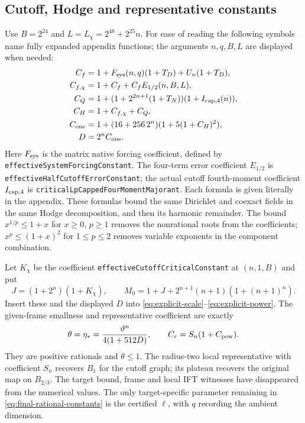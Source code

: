 \documentclass[11pt,a4paper]{article}
\numberwithin{equation}{section}
\theoremstyle{definition}
\theoremstyle{remark}
\newcommand{\lean}[1]{\nolinkurl{#1}}
\begin{document}
\subsection{Cutoff, Hodge and representative constants}
Use $B=2^{24}$ and $L=L_\chi=2^{48}+2^{25}n$.
For ease of reading the following symbols name fully expanded appendix
functions; the arguments $n,q,B,L$ are displayed when needed:
\begin{align*}
 C_f&=1+F_{\rm sys}(n,q)(1+T_D)+U_n(1+T_D),\\
 C_{f,\chi}&=1+C_f+C_fE_{1/2}(n,B,L),\\
 C_Q&=1+(1+2^{2n+1}(1+T_N))(1+I_{\rm cap,4}(n)),\\
 C_H&=1+C_{f,\chi}+C_Q,\\
 C_{\rm one}&=1+(16+256\,2^n)(1+5(1+C_H)^2),\\
 D&=2^n C_{\rm one}.
\end{align*}
Here $F_{\rm sys}$ is the matrix native forcing coefficient, defined by
\lean{effectiveSystemForcingConstant}. The four-term error coefficient
$E_{1/2}$ is \lean{effectiveHalfCutoffErrorConstant}; the actual cutoff
fourth-moment coefficient $I_{\rm cap,4}$ is
\lean{criticalLpCappedFourMomentMajorant}. Each formula is given literally
in the appendix.
These formulas bound the same Dirichlet and coexact fields in the same
Hodge decomposition, and then its harmonic remainder. The bound
$x^{1/p}\leq1+x$ for $x\geq0$, $p\geq1$ removes the nonrational roots
from the coefficients; $x^p\leq(1+x)^2$ for $1\leq p\leq2$ removes
variable exponents in the component combination.

Let $K_\chi$ be the coefficient
\lean{effectiveCutoffCriticalConstant} at $(n,1,B)$ and put
\[
 J=(1+2^n)(1+K_\chi),\qquad
 M_0=1+J+2^{n+1}(n+1)(1+(n+1)^n).
\]
Insert these and the displayed $D$ into
\eqref{eq:explicit-scale}--\eqref{eq:explicit-power}. The given-frame
smallness and representative coefficient are exactly
\begin{equation}\label{eq:theta-Cr-ledger}
 \theta=\eta_*=\frac{\vartheta^n}{4(1+512D)},\qquad
 C_r=S_n(1+C_{\rm pow}).
\end{equation}
They are positive rationals and $\theta\leq1$.
The radius-two local representative with coefficient $S_n$ recovers
$B_1$ for the cutoff graph; its plateau recovers the original map on
$B_{2/3}$. The target bound, frame and local IFT witnesses have disappeared
from the numerical values. The only target-specific parameter remaining
in \eqref{eq:final-rational-constants} is the certified $\ell$, with $q$
recording the ambient dimension.
\end{document}

